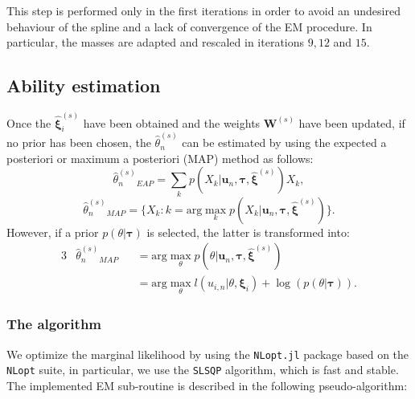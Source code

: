 This step is performed only in the first iterations in order to avoid an undesired behaviour of the spline and a lack of convergence of the EM procedure. In particular, the masses are adapted and rescaled in iterations $9,12$ and $15$.

\subsection{Ability estimation}

Once the $\hat{\boldsymbol{\xi}}_i^{(s)}$ have been obtained and the weights $\boldsymbol{W}^{(s)}$ have been updated, if no prior has been chosen, the $\hat{\theta}_n^{(s)}$ can be estimated by using the expected a posteriori \parencite[EAP, ][]{BockMislevy1982} or maximum a posteriori (MAP) method as follows:
\begin{equation}
\hat{\theta}_n^{(s)}{}_{EAP}=\sum_k{p(X_k|\mathbf{u}_n,\boldsymbol{\tau},\hat{\boldsymbol{\xi}}^{(s)})X_k},
\end{equation}
\begin{equation}
\hat{\theta}_n^{(s)}{}_{MAP}=\{X_k : k=\text{arg}\max_k p(X_k|\mathbf{u}_n,\boldsymbol{\tau},\hat{\boldsymbol{\xi}}^{(s)}) \}.
\end{equation}
However, if a prior $p(\theta|\boldsymbol{\tau})$ is selected, the latter is transformed into:
\begin{alignat*}{3}
& \hat{\theta}_n^{(s)}{}_{MAP}&&=\text{arg}\max_\theta p(        \theta|\mathbf{u}_n,\boldsymbol{\tau},\hat{\boldsymbol{\xi}}^{(s)}) \\
& &&=\text{arg}\max_\theta \mathit{l}(u_{i,n}|\theta,\boldsymbol{\xi}_i)+\log(p(\theta|\boldsymbol{\tau})).
\end{alignat*}

\pagebreak

\subsubsection{The algorithm}

We optimize the marginal likelihood by using the \texttt{NLopt.jl} package based on the \texttt{NLopt} suite, in particular, we use the \texttt{SLSQP} algorithm, which is fast and stable. The implemented EM sub-routine is described in the following pseudo-algorithm:

